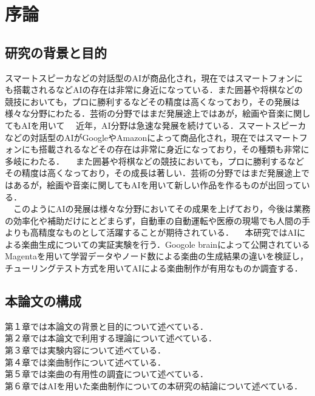 \chapter{序論}

\section{研究の背景と目的}
スマートスピーカなどの対話型のAIが商品化され，現在ではスマートフォンにも搭載されるなどAIの存在は非常に身近になっている．また囲碁や将棋などの競技においても，プロに勝利するなどその精度は高くなっており，その発展は様々な分野にわたる．芸術の分野ではまだ発展途上ではあが，絵画や音楽に関してもAIを用いて
　近年，AI分野は急速な発展を続けている．スマートスピーカなどの対話型のAIがGoogleやAmazonによって商品化され，現在ではスマートフォンにも搭載されるなどその存在は非常に身近になっており，その種類も非常に多岐にわたる．
　また囲碁や将棋などの競技においても，プロに勝利するなどその精度は高くなっており，その成長は著しい．芸術の分野ではまだ発展途上ではあるが，絵画や音楽に関してもAIを用いて新しい作品を作るものが出回っている．\\
　このようにAIの発展は様々な分野においてその成果を上げており，今後は業務の効率化や補助だけにとどまらず，自動車の自動運転や医療の現場でも人間の手よりも高精度なものとして活躍することが期待されている．
　本研究ではAIによる楽曲生成についての実証実験を行う．Googole brainによって公開されているMagentaを用いて学習データやノード数による楽曲の生成結果の違いを検証し，チューリングテスト方式を用いてAIによる楽曲制作が有用なものか調査する．


\section{本論文の構成}
第１章では本論文の背景と目的について述べている．\\
第２章では本論文で利用する理論について述べている．\\
第３章では実験内容について述べている．\\
第４章では楽曲制作について述べている．\\
第５章では楽曲の有用性の調査について述べている．\\
第６章ではAIを用いた楽曲制作についての本研究の結論について述べている．\\